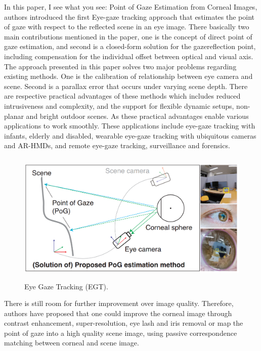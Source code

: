 In this paper, I see what you see: Point of Gaze Estimation from Corneal Images, authors introduced the first Eye-gaze tracking approach that estimates the point of gaze  with respect to the reflected scene in an eye image. There basically two main contributions mentioned in the paper, one is the concept of direct point of gaze estimation, and second is a closed-form solution for the gazereflection point, including compensation for the individual offset between optical and visual axis. The approach presented in this paper solves two major problems regarding existing methods. One is the calibration of relationship between eye camera and scene. Second is a parallax error that occurs under varying scene depth. There are respective practical advantages of these methods which includes reduced intrusiveness and complexity, and the support for flexible dynamic setups, non-planar and bright outdoor scenes. As these practical advantages enable various applications to work smoothly. These applications include eye-gaze tracking with infants, elderly and disabled, wearable eye-gaze tracking with ubiquitous cameras and AR-HMDs, and remote eye-gaze tracking, surveillance and forensics.

\begin{figure}[!hbt]
  \centering
  \includegraphics[width=4.5in,height=2.5in]{chrisitanN.png}
  \caption{Eye Gaze Tracking (EGT).}
  \label{christian}
\end{figure}

There is still room for further improvement over image quality. Therefore, authors have proposed that one could improve the corneal image through contrast enhancement, super-resolution, eye lash and iris removal or map the point of gaze into a high quality scene image, using passive correspondence matching between corneal and scene image.


